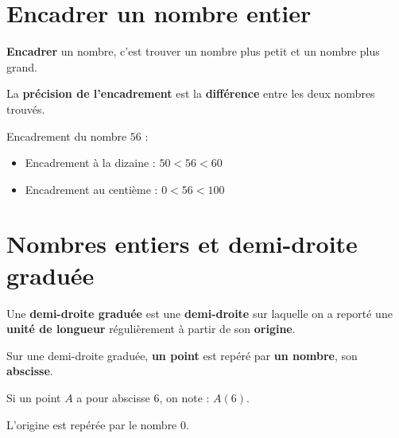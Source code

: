 \begin{pageCours}

\section{Encadrer un nombre entier}

\begin{Def}
\textbf{Encadrer} un nombre, c'est trouver un nombre plus petit et un nombre plus grand.

La \textbf{précision de l'encadrement} est la \textbf{différence} entre les deux nombres trouvés.
\end{Def}

\begin{Ex}
Encadrement du nombre $56$ :
 \begin{itemize}
\item Encadrement à la dizaine : \(50 < 56< 60\)

\item Encadrement au centième : \(0 < 56< 100\)
 \end{itemize}
\end{Ex}


\section{Nombres entiers et demi-droite graduée}

\begin{Def}
Une \textbf{demi-droite graduée} est une \textbf{demi-droite} sur laquelle on a reporté une \textbf{unité de longueur} régulièrement à partir de son \textbf{origine}.

Sur une demi-droite graduée, \textbf{un point} est repéré par \textbf{un nombre}, son \textbf{abscisse}.

Si un point $A$ a pour abscisse $6$, on note : $A(6)$.

L'origine est repérée par le nombre $0$.


\end{Def}
\end{pageCours}

